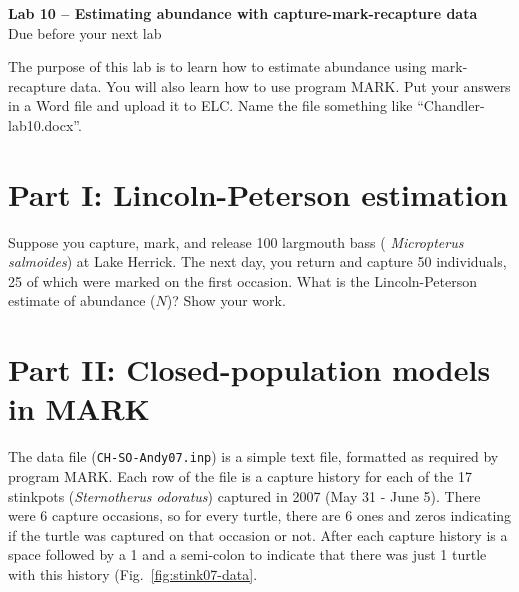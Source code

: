 \documentclass[12pt]{article}
\begin{document}
{
  \Large
  \centering
  {\bf Lab 10 -- Estimating abundance with
    capture-mark-recapture data} \\
  Due before your next lab \par
}

\vspace{10pt}


The purpose of this lab is to learn how to %
estimate abundance using mark-recapture data. You will also learn how
to use program MARK. Put your answers in a Word file and upload it to
ELC. Name the file something like ``Chandler-lab10.docx''. 





\section*{\large Part I: Lincoln-Peterson estimation}
Suppose you capture, mark, and release 100 largmouth bass ({\it
  Micropterus salmoides}) at Lake Herrick. The next day, you return
and capture 50 individuals, 25 of which were marked on the first
occasion. What is the Lincoln-Peterson estimate of abundance ($N$)?
Show your work. 





\section*{\large  Part II: Closed-population models in MARK}
The data file (\verb+CH-SO-Andy07.inp+) is a simple text file, formatted
as required by program MARK. Each row of the file is a capture history
for each of the 17 stinkpots ({\it Sternotherus odoratus}) captured in
2007 (May 31 - June 5). There were 6 capture occasions, so for every
turtle, there are 6 ones and zeros indicating if the turtle was
captured on that occasion or not. After each capture history is a
space followed by a 1 and a semi-colon to indicate that there was just
1 turtle with this history (Fig.~\ref{fig:stink07-data}.
\end{document}
